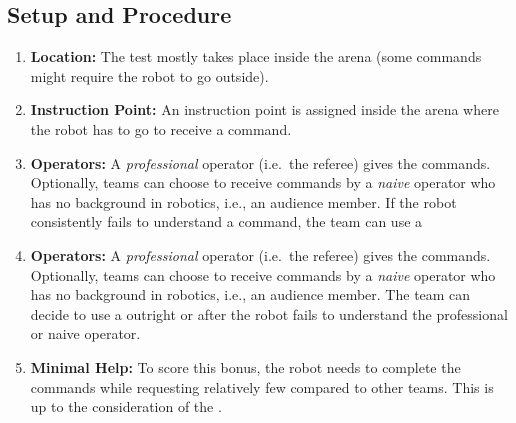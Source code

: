 \subsection*{Setup and Procedure}
\begin{enumerate}
	\item \textbf{Location:} The test mostly takes place inside the arena (some commands might require the robot to go outside).
	
	\item \textbf{Instruction Point:} An instruction point is assigned inside the arena where the robot has to go to receive a command.

	\item \textbf{Operators:} A \emph{professional} operator (i.e.~the referee) gives the commands. Optionally, teams can choose to receive commands by a \emph{naive} operator who has no background in robotics, i.e., an audience member. If the robot consistently fails to understand a command, the team can use a \CustomOperator{}

	\item \textbf{Operators:} A \emph{professional} operator (i.e.~the referee) gives the commands. Optionally, teams can choose to receive commands by a \emph{naive} operator who has no background in robotics, i.e., an audience member. The team can decide to use a \CustomOperator{} outright or after the robot fails to understand the professional or naive operator.
	
	\item \textbf{Minimal Help:} To score this bonus, the robot needs to complete the commands while requesting relatively few  compared to other teams. This is up to the consideration of the .
\end{enumerate}

%
%

